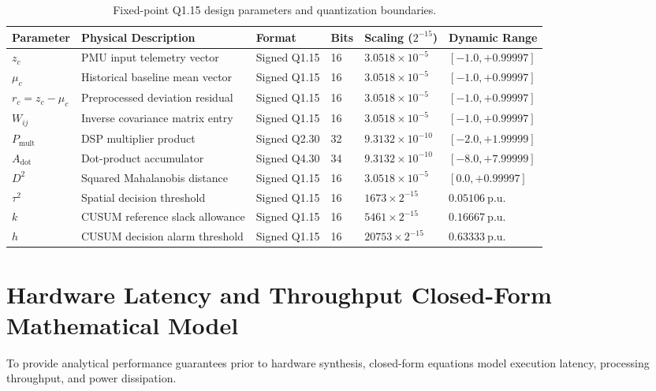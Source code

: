 \documentclass[12pt,a4paper]{report}
\begin{document}
\begin{table}[H]
\centering
\caption{Fixed-point Q1.15 design parameters and quantization boundaries.}
\label{tab:q15_params}
\small
\renewcommand{\arraystretch}{1.25}
\begin{tabular}{|p{2.6cm}|p{4.2cm}|p{2.0cm}|p{1.4cm}|p{2.4cm}|p{2.4cm}|}
\hline
\textbf{Parameter} & \textbf{Physical Description} & \textbf{Format} & \textbf{Bits} & \textbf{Scaling ($2^{-15}$)} & \textbf{Dynamic Range} \\
\hline
$z_c$ & PMU input telemetry vector & Signed Q1.15 & 16 & $3.0518 \times 10^{-5}$ & $[-1.0, +0.99997]$ \\
\hline
$\mu_c$ & Historical baseline mean vector & Signed Q1.15 & 16 & $3.0518 \times 10^{-5}$ & $[-1.0, +0.99997]$ \\
\hline
$r_c = z_c - \mu_c$ & Preprocessed deviation residual & Signed Q1.15 & 16 & $3.0518 \times 10^{-5}$ & $[-1.0, +0.99997]$ \\
\hline
$W_{ij}$ & Inverse covariance matrix entry & Signed Q1.15 & 16 & $3.0518 \times 10^{-5}$ & $[-1.0, +0.99997]$ \\
\hline
$P_{\text{mult}}$ & DSP multiplier product & Signed Q2.30 & 32 & $9.3132 \times 10^{-10}$ & $[-2.0, +1.99999]$ \\
\hline
$A_{\text{dot}}$ & Dot-product accumulator & Signed Q4.30 & 34 & $9.3132 \times 10^{-10}$ & $[-8.0, +7.99999]$ \\
\hline
$D^2$ & Squared Mahalanobis distance & Signed Q1.15 & 16 & $3.0518 \times 10^{-5}$ & $[0.0, +0.99997]$ \\
\hline
$\tau^2$ & Spatial decision threshold & Signed Q1.15 & 16 & $1673 \times 2^{-15}$ & $0.05106~\text{p.u.}$ \\
\hline
$k$ & CUSUM reference slack allowance & Signed Q1.15 & 16 & $5461 \times 2^{-15}$ & $0.16667~\text{p.u.}$ \\
\hline
$h$ & CUSUM decision alarm threshold & Signed Q1.15 & 16 & $20753 \times 2^{-15}$ & $0.63333~\text{p.u.}$ \\
\hline
\end{tabular}
\end{table}

\section{Hardware Latency and Throughput Closed-Form Mathematical Model}
To provide analytical performance guarantees prior to hardware synthesis, closed-form
equations model execution latency, processing throughput, and power dissipation.
\end{document}

